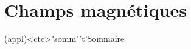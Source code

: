 \documentclass[../../main/main.tex]{subfiles}
\begin{document}
\setcounter{chapter}{0}


\chapter{Champs magnétiques}

\vspace*{\fill}

\begin{tcn}(appl)<ctc>"somm"'t'{Sommaire}
	\let\item\olditem
	\vspace{-15pt}
	\minitoc
	\vspace{-25pt}
\end{tcn}
\end{document}
